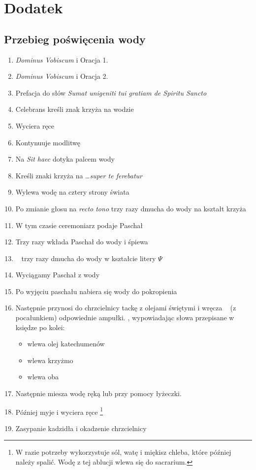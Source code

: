 \section{Dodatek}

\subsection{Przebieg poświęcenia wody}
\label{sec:woda}
\begin{enumerate}
      \item \textit{Dominus Vobiscum} i Oracja 1.
      \item \textit{Dominus Vobiscum} i Oracja 2.
      \item Prefacja do słów \textit{Sumat unigeniti tui gratiam de Spiritu
                  Sancto}
      \item Celebrans kreśli znak krzyża na wodzie
      \item Wyciera ręce
      \item Kontynuuje modlitwę
      \item Na \textit{Sit haec} dotyka palcem wody
      \item Kreśli znaki krzyża na \dots \textit{super te ferebatur}
      \item Wylewa wodę na cztery strony świata
      \item Po zmianie głosu na \textit{recto tono} trzy razy dmucha do wody na
            kształt krzyża
      \item W tym czasie ceremoniarz podaje Paschał
      \item Trzy razy wkłada Paschał do wody i śpiewa
      \item \ii~ trzy razy dmucha do wody w kształcie litery {\Large ${\Psi}$}
      \item Wyciągamy Paschał z wody
      \item Po wyjęciu paschału nabiera się wody do pokropienia
      \item Następnie  przynosi do chrzcielnicy tackę z olejami świętymi i
            wręcza \ii~ (z pocałunkiem) odpowiednie ampułki. \ii, wypowiadając
            słowa przepisane w księdze po kolei:
            \begin{itemize}
                  \item wlewa olej katechumenów
                  \item wlewa krzyżmo
                  \item wlewa oba
            \end{itemize}
      \item Następnie miesza wodę ręką lub przy pomocy łyżeczki.
      \item Później myje i wyciera ręce \footnote{W razie potrzeby wykorzystuje sól, watę i
                  miękisz chleba, które później należy spalić. Wodę z tej ablucji wlewa
                  się do sacrarium.}
      \item Zasypanie kadzidła i okadzenie chrzcielnicy
\end{enumerate}

